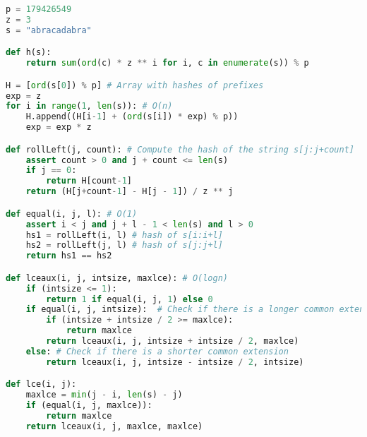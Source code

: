 \begin{lstlisting}[frame=single,language=Python,caption={Source code to compute the longest common extension efficiently.},label=listing:lce]
p = 179426549
z = 3
s = "abracadabra"

def h(s):
    return sum(ord(c) * z ** i for i, c in enumerate(s)) % p

H = [ord(s[0]) % p] # Array with hashes of prefixes
exp = z
for i in range(1, len(s)): # O(n)
    H.append((H[i-1] + (ord(s[i]) * exp) % p))
    exp = exp * z

def rollLeft(j, count): # Compute the hash of the string s[j:j+count]
    assert count > 0 and j + count <= len(s)
    if j == 0:
        return H[count-1]
    return (H[j+count-1] - H[j - 1]) / z ** j

def equal(i, j, l): # O(1)
    assert i < j and j + l - 1 < len(s) and l > 0
    hs1 = rollLeft(i, l) # hash of s[i:i+l]
    hs2 = rollLeft(j, l) # hash of s[j:j+l]
    return hs1 == hs2

def lceaux(i, j, intsize, maxlce): # O(logn)
    if (intsize <= 1):
        return 1 if equal(i, j, 1) else 0
    if equal(i, j, intsize):  # Check if there is a longer common extension
        if (intsize + intsize / 2 >= maxlce):
            return maxlce
        return lceaux(i, j, intsize + intsize / 2, maxlce)
    else: # Check if there is a shorter common extension
        return lceaux(i, j, intsize - intsize / 2, intsize)

def lce(i, j):
    maxlce = min(j - i, len(s) - j)
    if (equal(i, j, maxlce)):
        return maxlce
    return lceaux(i, j, maxlce, maxlce)
\end{lstlisting}

